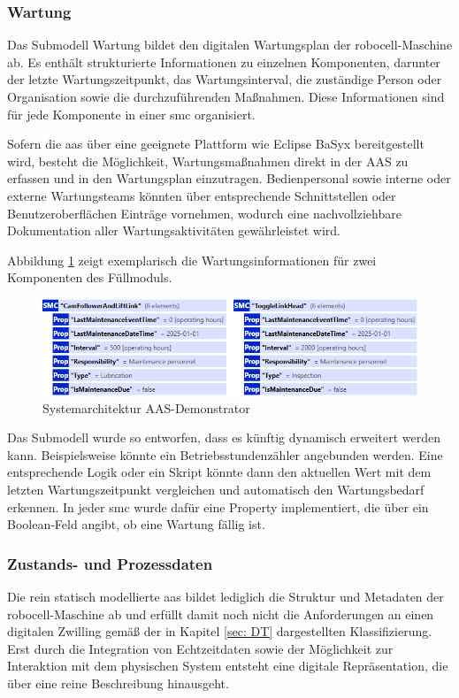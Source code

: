 \subsubsection*{Wartung}
\vspace{-0.5em}
Das Submodell Wartung bildet den digitalen Wartungsplan der robocell-Maschine ab. 
Es enthält strukturierte Informationen zu einzelnen Komponenten, darunter der letzte Wartungszeitpunkt, das Wartungsinterval, die zuständige Person oder Organisation sowie die durchzuführenden Maßnahmen. 
Diese Informationen sind für jede Komponente in einer \acs{smc} organisiert.

Sofern die \acs{aas} über eine geeignete Plattform wie Eclipse BaSyx bereitgestellt wird, besteht die Möglichkeit, Wartungsmaßnahmen direkt in der AAS zu erfassen und in den Wartungsplan einzutragen. 
Bedienpersonal sowie interne oder externe Wartungsteams könnten über entsprechende Schnittstellen oder Benutzeroberflächen Einträge vornehmen, wodurch eine nachvollziehbare Dokumentation aller Wartungsaktivitäten gewährleistet wird.

Abbildung \ref{fig:Wartung} zeigt exemplarisch die Wartungsinformationen für zwei Komponenten des Füllmoduls.

\begin{figure}[htbp]
    \centering
        \includegraphics[width=1\textwidth]{Bilder/Ergebnisse/StatischeDaten/Wartung.png}
    \caption{Systemarchitektur AAS-Demonstrator}
    \label{fig:Wartung}
\end{figure}

Das Submodell wurde so entworfen, dass es künftig dynamisch erweitert werden kann. 
Beispielsweise könnte ein Betriebsstundenzähler angebunden werden. 
Eine entsprechende Logik oder ein Skript könnte dann den aktuellen Wert mit dem letzten Wartungszeitpunkt vergleichen und automatisch den Wartungsbedarf erkennen. 
In jeder \acs{smc} wurde dafür eine Property implementiert, die über ein Boolean-Feld angibt, ob eine Wartung fällig ist.

\subsubsection{Zustands- und Prozessdaten}
Die rein statisch modellierte \acs{aas} bildet lediglich die Struktur und Metadaten der robocell-Maschine ab und erfüllt damit noch nicht die Anforderungen an einen digitalen Zwilling gemäß der in Kapitel \ref{sec: DT} dargestellten Klassifizierung. 
Erst durch die Integration von Echtzeitdaten sowie der Möglichkeit zur Interaktion mit dem physischen System entsteht eine digitale Repräsentation, die über eine reine Beschreibung hinausgeht.

